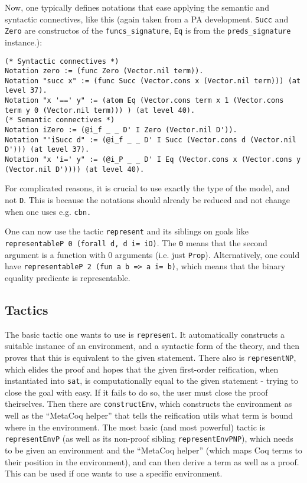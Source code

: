 \documentclass[11pt,a4paper]{article}
\begin{document}
Now, one typically defines notations that ease applying the semantic and syntactic connectives, like this (again taken from a PA development. \lstinline|Succ| and \lstinline|Zero| are constructos of the \lstinline|funcs_signature|, \lstinline|Eq| is from the \lstinline|preds_signature| instance.):
\begin{lstlisting}
(* Syntactic connectives *)
Notation zero := (func Zero (Vector.nil term)).
Notation "succ x" := (func Succ (Vector.cons x (Vector.nil term))) (at level 37).
Notation "x '==' y" := (atom Eq (Vector.cons term x 1 (Vector.cons term y 0 (Vector.nil term))) ) (at level 40).
(* Semantic connectives *)
Notation iZero := (@i_f _ _ D' I Zero (Vector.nil D')).
Notation "'iSucc d" := (@i_f _ _ D' I Succ (Vector.cons d (Vector.nil D'))) (at level 37).
Notation "x 'i=' y" := (@i_P _ _ D' I Eq (Vector.cons x (Vector.cons y (Vector.nil D')))) (at level 40).
\end{lstlisting}

For complicated reasons, it is crucial to use exactly the type of the model, and not \lstinline|D|. This is because the notations should already be reduced and not change when one uses e.g. \lstinline|cbn.|

One can now use the tactic \lstinline|represent| and its siblings on goals like \lstinline|representableP 0 (forall d, d i= iO)|. The \lstinline|0| means that the second argument is a function with 0 arguments (i.e. just \lstinline|Prop|). Alternatively, one could have \lstinline|representableP 2 (fun a b => a i= b)|, which means that the binary equality predicate is representable.
\subsection{Tactics}
The basic tactic one wants to use is \lstinline|represent|. It automatically constructs a suitable instance of an environment, and a syntactic form of the theory, and then proves that this is equivalent to the given statement. There also is \lstinline|representNP|, which elides the proof and hopes that the given first-order reification, when instantiated into \lstinline|sat|, is computationally equal to the given statement - trying to close the goal with easy. If it fails to do so, the user must close the proof theirselves.
Then there are \lstinline|constructEnv|, which constructs the environment as well as the \enquote{MetaCoq helper} that tells the reification utils what term is bound where in the environment.
The most basic (and most powerful) tactic is \lstinline|representEnvP| (as well as its non-proof sibling \lstinline|representEnvPNP|), which needs to be given an environment and the \enquote{MetaCoq helper} (which maps Coq terms to their position in the environment), and can then derive a term as well as a proof. This can be used if one wants to use a specific environment.
\end{document}
